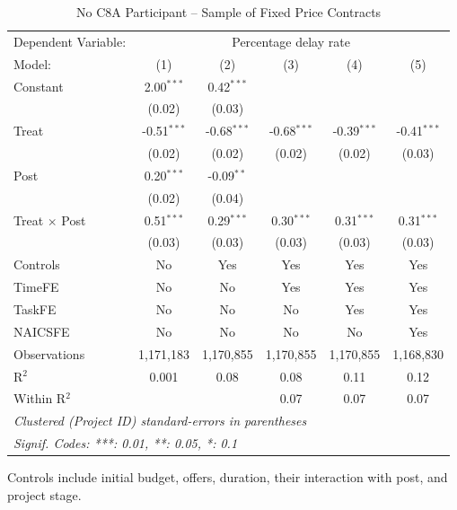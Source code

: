 \documentclass[
]{article}
\begin{document}
\begin{table}[htbp]
   \caption{No C8A Participant -- Sample of Fixed Price Contracts}
   \centering
   \footnotesize
   \begin{tabular}{lccccc}
      \tabularnewline \midrule \midrule
      Dependent Variable: & \multicolumn{5}{c}{Percentage delay rate}\\
      Model:               & (1)           & (2)           & (3)           & (4)           & (5)\\  
      Constant             & 2.00$^{***}$  & 0.42$^{***}$  &               &               &   \\   
                           & (0.02)        & (0.03)        &               &               &   \\   
      Treat                & -0.51$^{***}$ & -0.68$^{***}$ & -0.68$^{***}$ & -0.39$^{***}$ & -0.41$^{***}$\\   
                           & (0.02)        & (0.02)        & (0.02)        & (0.02)        & (0.03)\\   
      Post                 & 0.20$^{***}$  & -0.09$^{**}$  &               &               &   \\   
                           & (0.02)        & (0.04)        &               &               &   \\   
      Treat $\times$ Post  & 0.51$^{***}$  & 0.29$^{***}$  & 0.30$^{***}$  & 0.31$^{***}$  & 0.31$^{***}$\\   
                           & (0.03)        & (0.03)        & (0.03)        & (0.03)        & (0.03)\\   
      Controls             & No            & Yes           & Yes           & Yes           & Yes\\  
      TimeFE               & No            & No            & Yes           & Yes           & Yes\\  
      TaskFE               & No            & No            & No            & Yes           & Yes\\  
      NAICSFE              & No            & No            & No            & No            & Yes\\  
      Observations         & 1,171,183     & 1,170,855     & 1,170,855     & 1,170,855     & 1,168,830\\  
      R$^2$                & 0.001         & 0.08          & 0.08          & 0.11          & 0.12\\  
      Within R$^2$         &               &               & 0.07          & 0.07          & 0.07\\  
      \midrule \midrule
      \multicolumn{6}{l}{\emph{Clustered (Project ID) standard-errors in parentheses}}\\
      \multicolumn{6}{l}{\emph{Signif. Codes: ***: 0.01, **: 0.05, *: 0.1}}\\
   \end{tabular}
   
   \par \raggedright 
   Controls include initial budget, offers, duration, their interaction with post, and project stage. 
\end{table}
\end{document}
